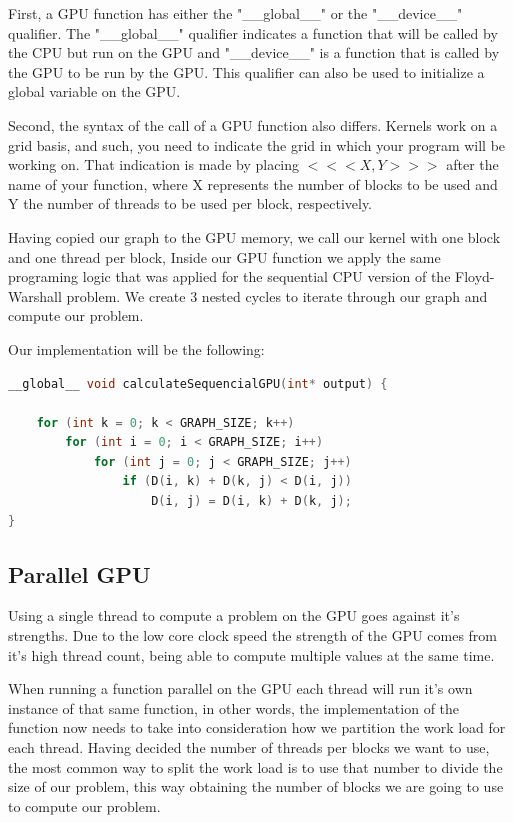 \documentclass[conference]{IEEEtran}
\begin{document}
First, a GPU function has either the "\_\_global\_\_" or the "\_\_device\_\_" qualifier.
The "\_\_global\_\_" qualifier indicates a function that will be called by the CPU but run on the GPU and "\_\_device\_\_" is a function that is called by the GPU to be run by the GPU. 
This qualifier can also be used to initialize a global variable on the GPU.

Second, the syntax of the call of a GPU function also differs. Kernels work on a grid basis, and such, you need to indicate the grid in which your program will be working on. 
That indication is made by placing
\begin{math} <<< X, Y >>> \end{math}
after the name of your function, where X represents the number of blocks to be used and Y the number of threads to be used per block, respectively. 

Having copied our graph to the GPU memory, we call our kernel with one block and one thread per block, 
Inside our GPU function we apply the same programing logic that was applied for the sequential CPU version of the Floyd-Warshall problem. 
We create 3 nested cycles to iterate through our graph and compute our problem.

Our implementation will be the following:
\begin{lstlisting}[language=C++, caption=Sequential CUDA]
	__global__ void calculateSequencialGPU(int* output) {
	
	for (int k = 0; k < GRAPH_SIZE; k++)
		for (int i = 0; i < GRAPH_SIZE; i++)
			for (int j = 0; j < GRAPH_SIZE; j++)
				if (D(i, k) + D(k, j) < D(i, j))
					D(i, j) = D(i, k) + D(k, j);
}
\end{lstlisting}


\subsection{Parallel GPU}
Using a single thread to compute a problem on the GPU goes against it's strengths. 
Due to the low core clock speed the strength of the GPU comes from it's high thread count, being able to compute multiple values at the same time. 

When running a function parallel on the GPU each thread will run it's own instance of that same function, in other words, the implementation of the function now needs to take into consideration how we partition the work load for each thread. 
Having decided the number of threads per blocks we want to use, the most common way to split the work load is to use that number to divide the size of our problem, this way obtaining the number of blocks we are going to use to compute our problem. 
\end{document}
